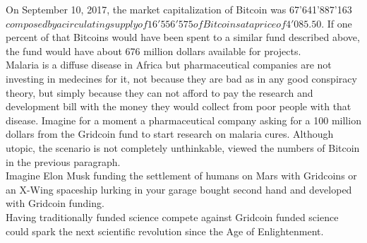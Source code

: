 On September 10, 2017, the market capitalization of Bitcoin was 67'641'887'163 $ composed by a circulating supply of 16'556'575 of Bitcoins at a price of 4'085.50 $. If one percent of that Bitcoins would have been spent to a similar fund described above, the fund would have about 676 million dollars available for projects.\\

Malaria is a diffuse disease in Africa but pharmaceutical companies are not investing in medecines for it, not because they are bad as in any good conspiracy theory, but simply because they can not afford to pay the research and development bill with the money they would collect from poor people with that disease. Imagine for a moment a pharmaceutical company asking for a 100 million dollars from the Gridcoin fund to start research on malaria cures. Although utopic, the scenario is not completely unthinkable, viewed the numbers of Bitcoin in the previous paragraph.\\

Imagine Elon Musk funding the settlement of humans on Mars with Gridcoins or an X-Wing spaceship lurking in your garage bought second hand and developed with Gridcoin funding.\\

Having traditionally funded science compete against Gridcoin funded science could spark the next scientific revolution since the Age of Enlightenment.\\
